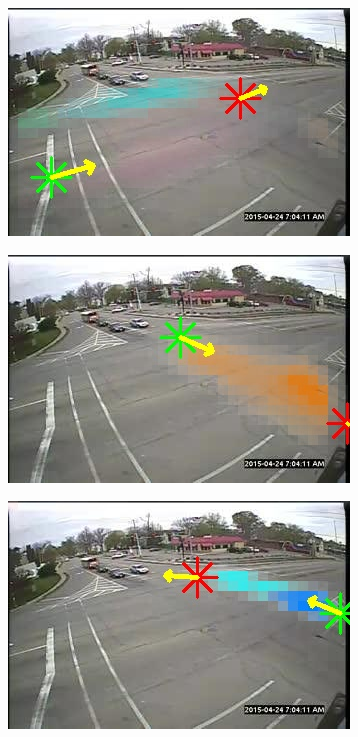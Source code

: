 \begin{figure}
    \centering
        \begin{subfigure}{0.32\linewidth}
            \includegraphics[width=\linewidth]{./img/scene_learning/res/230955/230955-0.jpg}
        \end{subfigure}
        \begin{subfigure}{0.32\linewidth}
            \includegraphics[width=\linewidth]{./img/scene_learning/res/230955/230955-1.jpg}
        \end{subfigure}
        \begin{subfigure}{0.32\linewidth}
            \includegraphics[width=\linewidth]{./img/scene_learning/res/230955/230955-2.jpg}

\end{subfigure}
\end{figure}
